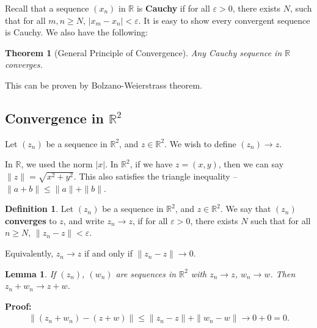 \documentclass[12pt]{article}
\newtheorem{theorem}{Theorem}[section]
\newtheorem{lemma}{Lemma}[section]
\theoremstyle{definition}
\newtheorem{definition}{Definition}[section]
\theoremstyle{remark}
\begin{document}
Recall that a sequence $(x_n)$ in $\mathbb{R}$ is \textbf{Cauchy} if for all $\varepsilon > 0$, there exists $N$, such that for all $m, n \geq N$, $|x_m - x_n| < \varepsilon$. It is easy to show every convergent sequence is Cauchy. We also have the following:

\begin{theorem}[General Principle of Convergence]
\item
	Any Cauchy sequence in $\mathbb{R}$ converges.
\end{theorem}

This can be proven by Bolzano-Weierstrass theorem.

\subsection{Convergence in \texorpdfstring{$\mathbb{R}^2$}{R\^2}}%
\label{sub:convergence_in_r_2_}

Let $(z_n)$ be a sequence in $\mathbb{R}^2$, and $z \in \mathbb{R}^2$. We wish to define $(z_n) \to z$.

In $\mathbb{R}$, we used the norm $|x|$. In $\mathbb{R}^2$, if we have $z = (x, y)$, then we can say $\|z\| = \sqrt{x^2 + y^2}$. This also satisfies the triangle inequality -- $\|a + b\| \leq \|a\| + \|b\|$.

\begin{definition}
	Let $(z_n)$ be a sequence in $\mathbb{R}^2$, and $z \in \mathbb{R}^2$. We say that $(z_n)$ \textbf{converges} to $z$, and write $z_n \to z$, if for all $\varepsilon > 0$, there exists $N$ such that for all $n \geq N$, $\|z_n - z\| < \varepsilon$.

	Equivalently, $z_n \to z$ if and only if $\|z_n - z\| \to 0$.
\end{definition}

\begin{adjustbox}{minipage = \columnwidth - 25.5pt, margin=1em, frame=1pt, margin=0em}
	\begin{lemma}
	If $(z_n)$, $(w_n)$ are sequences in $\mathbb{R}^2$ with $z_n \to z$, $w_n \to w$. Then $z_n + w_n \to z + w$.
\end{lemma}

\textbf{Proof:}
\begin{align*}
	\|(z_n + w_n) - (z + w)\| \leq \|z_n - z\| + \|w_n - w\| \to 0 + 0 = 0.
\end{align*}

\end{adjustbox}
\end{document}
